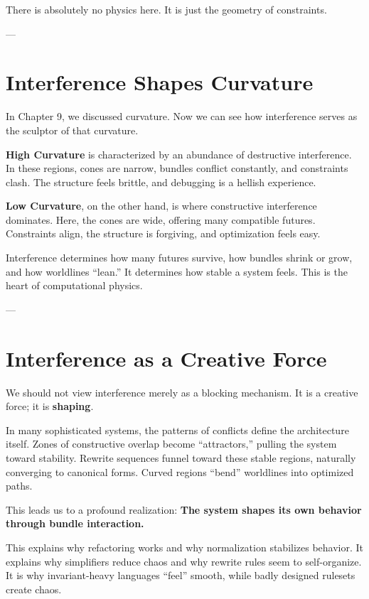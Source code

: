 There is absolutely no physics here. It is just the geometry of constraints.

---

\section{\texorpdfstring{\textbf{Interference Shapes Curvature}}{12.9 --- Interference Shapes Curvature}}

In Chapter 9, we discussed curvature. Now we can see how interference serves as the sculptor of that curvature.

\textbf{High Curvature} is characterized by an abundance of destructive interference. In these regions, cones are narrow, bundles conflict constantly, and constraints clash. The structure feels brittle, and debugging is a hellish experience.

\textbf{Low Curvature}, on the other hand, is where constructive interference dominates. Here, the cones are wide, offering many compatible futures. Constraints align, the structure is forgiving, and optimization feels easy.

Interference determines how many futures survive, how bundles shrink or grow, and how worldlines ``lean.'' It determines how stable a system feels. This is the heart of computational physics.

---

\section{\texorpdfstring{\textbf{Interference as a Creative Force}}{12.10 --- Interference as a Creative Force}}

We should not view interference merely as a blocking mechanism. It is a creative force; it is \textbf{shaping}.

In many sophisticated systems, the patterns of conflicts define the architecture itself. Zones of constructive overlap become ``attractors,'' pulling the system toward stability. Rewrite sequences funnel toward these stable regions, naturally converging to canonical forms. Curved regions ``bend'' worldlines into optimized paths.

This leads us to a profound realization: \textbf{The system shapes its own behavior through bundle interaction.}

This explains why refactoring works and why normalization stabilizes behavior. It explains why simplifiers reduce chaos and why rewrite rules seem to self-organize. It is why invariant-heavy languages ``feel'' smooth, while badly designed rulesets create chaos.

